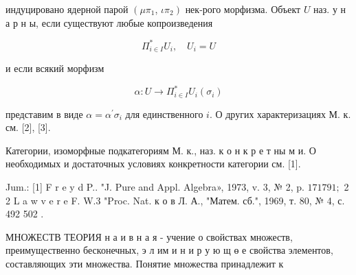 \documentclass[10pt]{article}
\begin{document}
индуцировано ядерной парой $\left(\mu \pi_{1}\right.$, $\left.\iota \pi_{2}\right)$ нек-рого морфизма. Объект $U$ наз. у н а р н ы, если существуют любые копроизведения



\[

\Pi_{i \in I}^{*} U_{i}, \quad U_{i}=U

\]



и если всякий морфизм



\[

\alpha: U \rightarrow \Pi_{i \in I}^{*} U_{i}\left(\sigma_{i}\right)

\]



представим в виде $\alpha=\alpha^{\prime} \sigma_{i}$ для единственного $i$. О других характеризациях М. к. см. [2], [3].



Категории, изоморфные подкатегориям М. к., наз. к о н к р е т ны м и. О необходимых и достаточных условиях конкретности категории см. [1].



Jum.: [1] F r e y d P.. "J. Pure and Appl. Algebra», 1973, v. 3, № 2, p. $171791 ;$ 2 2 L a w v e r e F. W.3 "Proc. Nat. к о в Л. А., "Матем. сб.", 1969, т. 80, № 4, с. 492 502 .



МНОЖЕСТВ ТЕОРИЯ н а и в н а я - учение о свойствах множеств, преимущественно бесконечных, э л им и н и р у ю щ ө е свойства элементов, составляющих эти множества. Понятие множества принадлежит к
\end{document}
